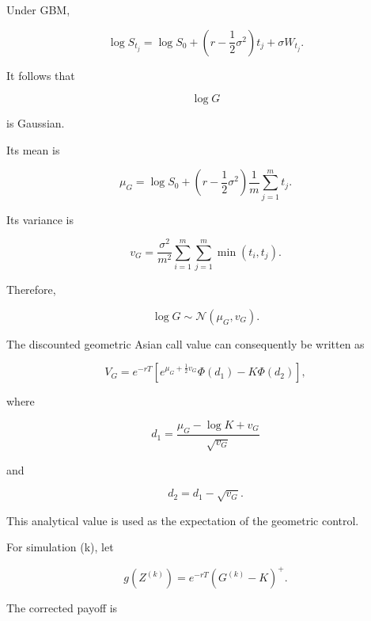 \documentclass[12pt,a4paper]{report}
\begin{document}
Under GBM,

\begin{equation}
\log S_{t_j}
=
\log S_0
+
\left(
r-\frac{1}{2}\sigma^2
\right)t_j
+
\sigma W_{t_j}.
\end{equation}

It follows that

\begin{equation}
\log G
\end{equation}

is Gaussian.

Its mean is

\begin{equation}
\mu_G
=
\log S_0
+
\left(
r-\frac{1}{2}\sigma^2
\right)
\frac{1}{m}
\sum_{j=1}^{m}
t_j.
\end{equation}

Its variance is

\begin{equation}
v_G
=
\frac{\sigma^2}{m^2}
\sum_{i=1}^{m}
\sum_{j=1}^{m}
\min(t_i,t_j).
\end{equation}

Therefore,

\begin{equation}
\log G
\sim
\mathcal{N}(\mu_G,v_G).
\end{equation}

The discounted geometric Asian call value can consequently be written as

\begin{equation}
V_G
=
e^{-rT}
\left[
e^{\mu_G+\frac{1}{2}v_G}
\Phi(d_1)
-
K\Phi(d_2)
\right],
\end{equation}

where

\begin{equation}
d_1
=
\frac{
\mu_G-\log K+v_G
}{
\sqrt{v_G}
}
\end{equation}

and

\begin{equation}
d_2
=
d_1-\sqrt{v_G}.
\end{equation}

This analytical value is used as the expectation of the geometric control.

For simulation (k), let

\begin{equation}
g(Z^{(k)})
=
e^{-rT}
\left(
G^{(k)}-K
\right)^+.
\end{equation}

The corrected payoff is
\end{document}
